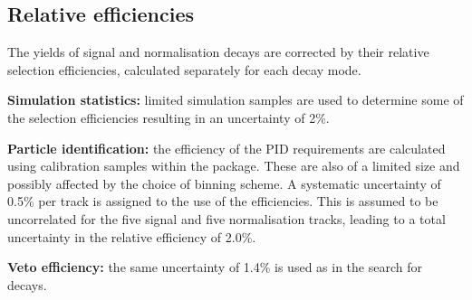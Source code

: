 \subsection{Relative efficiencies}
The yields of signal and normalisation decays are corrected by their relative selection efficiencies, calculated separately for each \Dsp decay mode. 

\begin{description}
\item \textbf{Simulation statistics:} limited simulation samples are used to determine some of the selection efficiencies resulting in an uncertainty of 2\%. 

\item \textbf{Particle identification:} the efficiency of the PID requirements are calculated using calibration samples within the \pidcalib package. These are also of a limited size and possibly affected by the choice of binning scheme. 
A systematic uncertainty of 0.5\% per track is assigned to the use of the \pidcalib efficiencies. This is assumed to be uncorrelated for the five signal and five normalisation tracks, leading to a total uncertainty in the relative efficiency of 2.0\%. 

\item \textbf{Veto efficiency:} the same uncertainty of 1.4\% is used as in the search for \decay{\Bp}{\Dsp\Kp\Km} decays.


\end{description}

